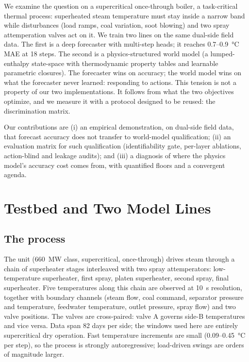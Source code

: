 \documentclass{article}
\begin{document}
We examine the question on a supercritical once-through boiler, a task-critical thermal
process: superheated steam temperature must stay inside a narrow band while disturbances
(load ramps, coal variation, soot blowing) and two spray attemperation valves act on
it. We train two lines on the same dual-side field data. The first is a deep forecaster
with multi-step heads; it reaches 0.7--0.9~\si{\degreeCelsius} MAE at 18 steps. The
second is a physics-structured world model (a lumped-enthalpy state-space with
thermodynamic property tables and learnable parametric closures). The forecaster wins on
accuracy; the world model wins on what the forecaster never learned: responding to
actions. This tension is not a property of our two implementations. It follows from what
the two objectives optimize, and we measure it with a protocol designed to be reused:
the discrimination matrix.

Our contributions are (i) an empirical demonstration, on dual-side field data, that
forecast accuracy does not transfer to world-model qualification; (ii) an evaluation
matrix for such qualification (identifiability gate, per-layer ablations, action-blind
and leakage audits); and (iii) a diagnosis of where the physics model's accuracy cost
comes from, with quantified floors and a convergent agenda.

\section{Testbed and Two Model Lines}

\subsection{The process}

The unit (660~MW class, supercritical, once-through) drives steam through a chain of
superheater stages interleaved with two spray attemperators: low-temperature
superheater, first spray, platen superheater, second spray, final superheater. Five
temperatures along this chain are observed at 10~s resolution, together with boundary
channels (steam flow, coal command, separator pressure and temperature, feedwater
temperature, outlet pressure, spray flow) and two valve positions. The valves are
cross-paired: valve A governs side-B temperatures and vice versa. Data span 82 days per
side; the windows used here are entirely supercritical dry operation. Fast temperature
increments are small (0.09--0.45~\si{\degreeCelsius} per step), so the process is
strongly autoregressive; load-driven swings are orders of magnitude larger.
\end{document}
